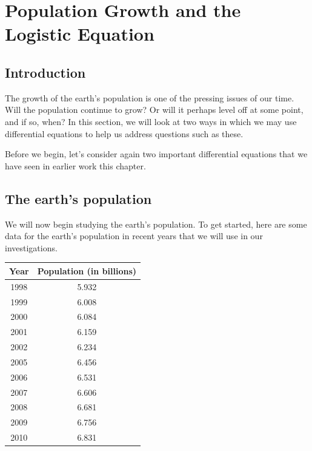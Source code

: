 \section{Population Growth and the Logistic Equation} 
\label{S:7.6.Logistic}

\vspace*{-14 pt}

\subsection*{Introduction}

The growth of the earth's population is one of the pressing issues of
our time.  Will the population continue to grow?  Or will it perhaps 
level off at some point, and if so, when?  In this section, we
will look at two ways in which we may use differential equations to
help us address questions such as these.

Before we begin, let's consider again two important differential
equations that we have seen in earlier work this chapter.



\subsection*{The earth's population}

We will now begin studying the earth's population.  To get started,
here are some data for the earth's population in recent years that we
will use in our investigations.

\begin{center}
  \begin{tabular}{|c|c|}
    \hline
    Year & Population (in billions) \\
    \hline
    1998 & 5.932 \\
    1999 & 6.008 \\
    2000 & 6.084 \\
    2001 & 6.159 \\
    2002 & 6.234 \\
    2005 & 6.456 \\
    2006 & 6.531 \\
    2007 & 6.606 \\
    2008 & 6.681 \\
    2009 & 6.756 \\
    2010 & 6.831 \\
    \hline
  \end{tabular}
\end{center}

